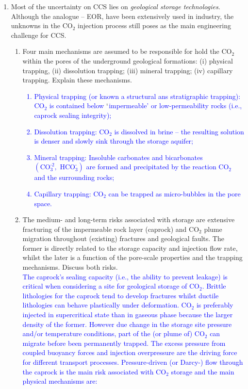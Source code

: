 \documentclass[14pt,twoside]{article}
\begin{document}
\begin{enumerate}
\item Most of the uncertainty on CCS lies on {\it geological storage technologies}. Although the analogue -- EOR, have been extensively used in industry, the unknowns in the CO$_{2}$ injection process still poses as the main engineering challenge for CCS. 
\begin{enumerate}
\item Four main mechanisms are assumed to be responsible for hold the CO$_{2}$ within the pores of the underground geological formations: (i) physical trapping, %
(ii) dissolution trapping; 
(iii) mineral trapping; 
(iv) capillary trapping. 
Explain these mechanisms.
  \textcolor{blue}{
\begin{enumerate}
\item Physical trapping (or known a structural ans stratigraphic trapping): CO$_{\text{2}}$ is contained below $\lq$impermeable' or low-permeability rocks (i.e., caprock sealing integrity); 
\item Dissolution trapping: CO$_{\text{2}}$ is dissolved in brine -- the resulting solution is denser and slowly sink through the storage aquifer;
\item Mineral trapping: Insoluble carbonates and bicarbonates $\left(\text{CO}_{\text{3}}^{\text{-2}},\text{ HCO}_{\text{3}}^{\text{-}}\right)$ are formed and precipitated by the reaction CO$_{\text{2}}$ and the surrounding rocks;
\item Capillary trapping: CO$_{\text{2}}$ can be trapped as micro-bubbles in the pore space.
\end{enumerate}
}
\item The medium- and long-term risks associated with storage are extensive fracturing of the impermeable rock layer (caprock) and CO$_{2}$ plume migration throughout (existing) fractures and geological faults. The former is directly related to the storage capacity and injection flow rate, whilst the later is a function of the pore-scale properties and the trapping mechanisms. Discuss both risks.\\
  \textcolor{blue}{
The caprock's sealing capacity (i.e., the ability to prevent leakage) is critical when considering a site for geological storage of CO$_{\text{2}}$. Brittle lithologies for the caprock tend to develop fractures whilst ductile lithologies can behave plastically under deformation. CO$_{\text{2}}$ is preferably injected in supercritical state than in gaseous phase because the larger density of the former. However due change in the storage site pressure and/or temperature conditions, part of the (or plume of) CO$_{\text{2}}$ can migrate before been permanently trapped. The excess pressure from coupled buoyancy forces and injection overpressure are the driving force for different transport processes. Pressure-driven (or Darcy-) flow through the caprock is the main risk associated with CO$_{\text{2}}$ storage and the main physical mechanisms are:
}
\end{enumerate}
\end{enumerate}
\end{document}
